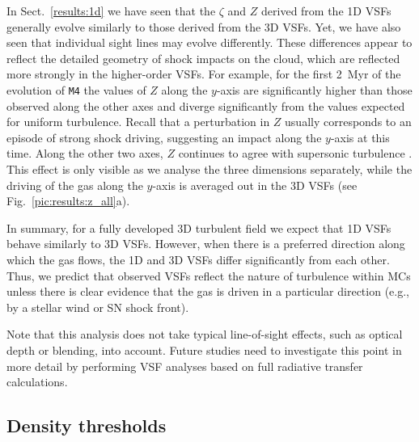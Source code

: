 In Sect.~\ref{results:1d} we have seen that the $\zeta$ and $Z$ derived from the 1D VSFs generally evolve similarly to those derived from the 3D VSFs.
Yet, we have also seen that individual sight lines may evolve differently.
These differences appear to reflect the detailed geometry of shock impacts on the cloud, which are reflected more strongly in the higher-order VSFs.
For example, for the first 2~Myr of the evolution of \texttt{M4} the values of $Z$ along the $y$-axis are significantly higher than those observed along the other axes and diverge significantly from the values expected for uniform turbulence.
Recall that a perturbation in $Z$ usually corresponds to an episode of strong shock driving, suggesting an impact along the $y$-axis at this time. 
Along the other two axes, $Z$ continues to agree with supersonic turbulence \citep{Boldyrev2002}.
This effect is only visible as we analyse the three dimensions separately, while the driving of the gas along the $y$-axis is averaged out in the 3D VSFs (see Fig.~\ref{pic:results:z_all}a).

In summary, for a fully developed 3D turbulent field we expect that 1D VSFs behave similarly to 3D VSFs.
However, when there is a preferred direction along which the gas flows, the 1D and 3D VSFs differ significantly from each other. 
Thus, we predict that observed VSFs reflect the nature of turbulence within MCs unless there is clear evidence that the gas is driven in a particular direction (e.g., by a stellar wind or SN shock front).

Note that this analysis does not take typical line-of-sight effects, such as optical depth or blending, into account. 
Future studies need to investigate this point in more detail by performing VSF analyses based on full radiative transfer calculations.

\subsection{Density thresholds}\label{discussion:densthres}

